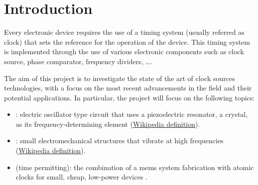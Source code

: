 \section{Introduction}

Every electronic device requires the use of a timing system (usually referred as clock) that sets the reference for the operation of the device.
This timing system is implemented through the use of various electronic components such as clock source, phase comparator, frequency dividers, \dots.

The aim of this project is to investigate the state of the art of clock sources technologies, with a focus on the most recent advancements in the field and their potential applications.
In particular, the project will focus on the following topics:

\begin{itemize}
    \item {}: electric oscillator type circuit that uses a piezoelectric resonator, a crystal, as its frequency-determining element (\href{https://en.wikipedia.org/wiki/Crystal_oscillator#Terminology}{Wikipedia definition}).
    \item {}: small electromechanical structures that vibrate at high frequencies (\href{https://en.wikipedia.org/wiki/Microelectromechanical_system_oscillator#Resonators}{Wikipedia definition}).
    \item {} (time permitting): the combination of a \acrshort{mems} system fabrication with atomic clocks for small, cheap, low-power devices \cite{KNAPPE2008571}.
\end{itemize}


